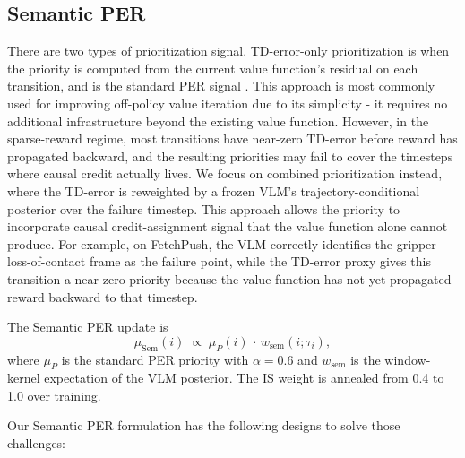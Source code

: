 \documentclass{article}
\begin{document}
\subsection{Semantic PER}
\label{sec:method:sper}

There are two types of prioritization signal. TD-error-only
prioritization is when the priority is computed from the current
value function's residual on each transition, and is the standard
PER signal \citep{schaul2016per}. This approach is most commonly
used for improving off-policy value iteration due to its
simplicity - it requires no additional infrastructure beyond the
existing value function. However, in the sparse-reward regime, most
transitions have near-zero TD-error before reward has propagated
backward, and the resulting priorities may fail to cover the
timesteps where causal credit actually lives. We focus on combined
prioritization instead, where the TD-error is reweighted by a
frozen VLM's trajectory-conditional posterior over the failure
timestep. This approach allows the priority to incorporate causal
credit-assignment signal that the value function alone cannot
produce. For example, on FetchPush, the VLM correctly identifies
the gripper-loss-of-contact frame as the failure point, while the
TD-error proxy gives this transition a near-zero priority because
the value function has not yet propagated reward backward to that
timestep.

The Semantic PER update is
\begin{equation}
  \mu_{\text{Sem}}(i) \;\propto\; \mu_P(i)\,\cdot\,w_{\text{sem}}(i;\tau_i),
  \label{eq:main}
\end{equation}
where $\mu_P$ is the standard PER priority with $\alpha\!=\!0.6$
and $w_{\text{sem}}$ is the window-kernel expectation of the VLM
posterior. The IS weight is annealed from 0.4 to 1.0 over training.

Our Semantic PER formulation has the following designs to solve
those challenges:
\end{document}
